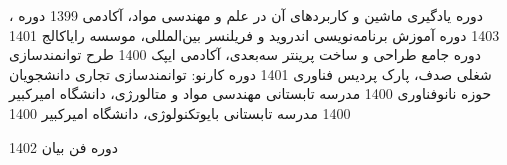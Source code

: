 

\begin{cvhonors}

  \cvhonor
    {دوره یادگیری ماشین و کاربردهای آن در علم و مهندسی مواد، آکادمی } %
    {1399} %
\cvhonor
{دوره ، } %
{1403} %
\cvhonor
{دوره آموزش برنامه‌نویسی اندروید و فریلنسر بین‌المللی، موسسه رایاکالج} %
{1401} %
  \cvhonor
{دوره جامع طراحی و ساخت پرینتر سه‌بعدی، آکادمی ایپک} %
{1400} %
  \cvhonor
{طرح توانمندسازی شغلی صدف، پارک پردیس فناوری} %
{1401} %
  \cvhonor
{دوره کارنو: توانمندسازی تجاری دانشجویان حوزه نانوفناوری} %
{1400} %
  \cvhonor
{مدرسه تابستانی مهندسی مواد و متالورژی، دانشگاه امیرکبیر} %
{1400} %
  \cvhonor
{مدرسه تابستانی بایوتکنولوژی، دانشگاه امیرکبیر} %
{1400} %
  

  \cvhonor
{دوره فن بیان} %
{1402} %



\end{cvhonors}
